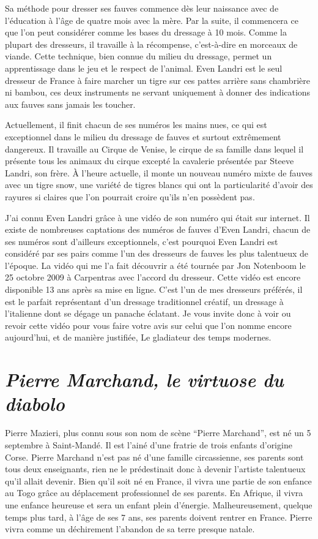 Sa méthode pour dresser ses fauves commence dès leur naissance avec de l'éducation à l'âge de quatre mois avec la mère. Par la suite, il commencera ce que l'on peut considérer comme les bases du dressage à 10 mois. Comme la plupart des dresseurs, il travaille à la récompense, c'est-à-dire en morceaux de viande. Cette technique, bien connue du milieu du dressage, permet un apprentissage dans le jeu et le respect de l'animal. Even Landri est le seul dresseur de France à faire marcher un tigre sur ces pattes arrière sans chambrière ni bambou, ces deux instruments ne servant uniquement à donner des indications aux fauves sans jamais les toucher.

Actuellement, il finit chacun de ses numéros les mains nues, ce qui est exceptionnel dans le milieu du dressage de fauves et surtout extrêmement dangereux. Il travaille au Cirque de Venise, le cirque de sa famille dans lequel il présente tous les animaux du cirque excepté la cavalerie présentée par Steeve Landri, son frère. À l'heure actuelle, il monte un nouveau numéro mixte de fauves avec un tigre snow, une variété de tigres blancs qui ont la particularité d'avoir des rayures si claires que l'on pourrait croire qu'ils n'en possèdent pas.

J'ai connu Even Landri grâce à une vidéo de son numéro qui était sur internet. Il existe de nombreuses captations des numéros de fauves d'Even Landri, chacun de ses numéros sont d'ailleurs exceptionnels, c'est pourquoi Even Landri est considéré par ses pairs comme l'un des dresseurs de fauves les plus talentueux de l'époque. La vidéo qui me l'a fait découvrir a été tournée par Jon Notenboom le 25 octobre 2009 à Carpentras avec l'accord du dresseur. Cette vidéo est encore disponible 13 ans après sa mise en ligne. C'est l'un de mes dresseurs préférés, il est le parfait représentant d'un dressage traditionnel créatif, un dressage à l'italienne dont se dégage un panache éclatant. Je vous invite donc à voir ou revoir cette vidéo pour vous faire votre avis sur celui que l’on nomme encore aujourd'hui, et de manière justifiée, Le gladiateur des temps modernes.

\section*{\textit{Pierre Marchand, le virtuose du diabolo}}

Pierre Mazieri, plus connu sous son nom de scène ``Pierre Marchand'', est né un 5 septembre à Saint-Mandé. Il est l'ainé d'une fratrie de trois enfants d'origine Corse. Pierre Marchand n'est pas né d'une famille circassienne, ses parents sont tous deux enseignants, rien ne le prédestinait donc à devenir l'artiste talentueux qu'il allait devenir. Bien qu'il soit né en France, il vivra une partie de son enfance au Togo grâce au déplacement professionnel de ses parents. En Afrique, il vivra une enfance heureuse et sera un enfant plein d'énergie. Malheureusement, quelque temps plus tard, à l'âge de ses 7 ans, ses parents doivent rentrer en France. Pierre vivra comme un déchirement l'abandon de sa terre presque natale.

